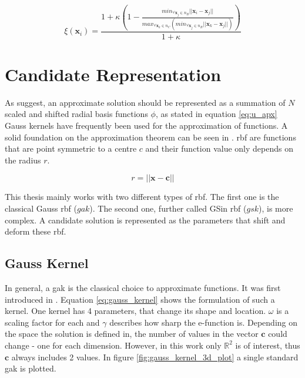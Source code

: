 \documentclass[./\jobname.tex]{subfiles}
\begin{document}
\begin{equation}
\label{eq:nc_weight}
\xi(\mathbf{x}_i) = \frac{1 + \kappa \left(1 - \frac{min_{\forall \mathbf{x}_j\in n_B}|| \mathbf{x}_i - \mathbf{x}_j ||}{max_{\forall\mathbf{x}_k \in n_C}(min_{\forall \mathbf{x}_j \in n_B} || \mathbf{x}_k - \mathbf{x}_j ||)}\right)}{1 + \kappa}
\end{equation}


\section{Candidate Representation}
\label{chap:candidate_rep}

As \cite{chaquet_using_2019} suggest, an approximate solution should be represented as a summation of $N$ scaled and shifted radial basis functions $\phi$, as stated in equation \eqref{eq:u_apx} Gauss kernels have frequently been used for the approximation of functions. A solid foundation on the approximation theorem can be seen in \cite{park_universal_1991}. \gls{rbf} are functions that are point symmetric to a centre $c$ and their function value only depends on the radius $r$. 

\begin{equation}
\label{eq: radius}
r = \left|\left|\mathbf{x} - \mathbf{c} \right|\right|
\end{equation}

This thesis mainly works with two different types of \gls{rbf}. The first one is the classical Gauss \gls{rbf} ($gak$). The second one, further called GSin \gls{rbf} ($gsk$), is more complex. A candidate solution is represented as the parameters that shift and deform these \gls{rbf}. 

\subsection{Gauss Kernel}
\label{chap:gauss_kernel}

In general, a \gls{gak} is the classical choice to approximate functions. It was first introduced in \cite{broomhead_multivariable_1988}. Equation \eqref{eq:gauss_kernel} shows the formulation of such a kernel. One kernel has 4 parameters, that change its shape and location. $\omega$ is a scaling factor for each and $\gamma$ describes how sharp the e-function is. Depending on the space the solution is defined in, the number of values in the vector $\mathbf{c}$ could change - one for each dimension. However, in this work only $\mathbb{R}^2$ is of interest, thus $\mathbf{c}$ always includes 2 values. In figure \ref{fig:gauss_kernel_3d_plot} a single standard \gls{gak} is plotted. 
\end{document}
